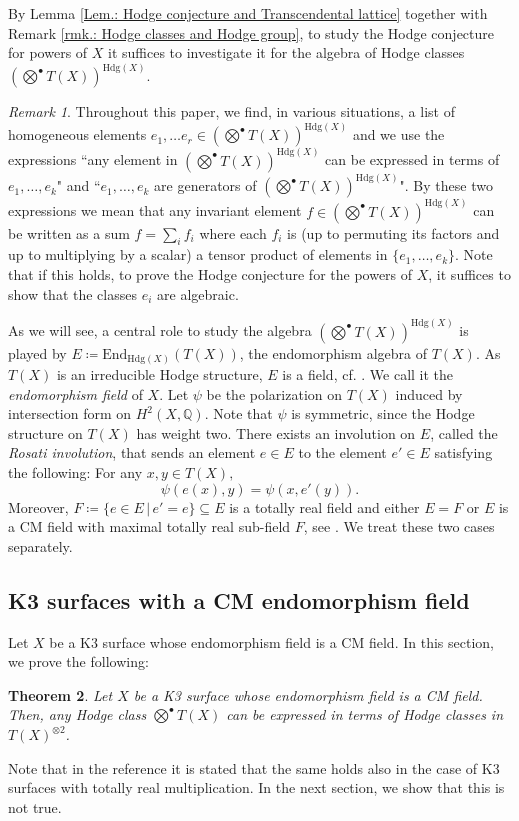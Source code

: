 \documentclass[11pt,twoside,a4paper]{amsart}
\newcommand{\0}{\mathscr{O}}
\theoremstyle{plain}
\newtheorem{thm}{Theorem}[section]
\theoremstyle{definition}
\theoremstyle{remark}
\newtheorem{rmk}[thm]{Remark}
\begin{document}
\smallskip

By Lemma \ref{Lem.: Hodge conjecture and Transcendental lattice} together with Remark \ref{rmk.: Hodge classes and Hodge group}, to study the Hodge conjecture for powers of $X$ it suffices to investigate it for the algebra of Hodge classes $\left(\bigotimes^{\bullet} T(X)\right)^{\mathrm{Hdg}(X)}$. 
\begin{rmk}
\label{rmk.: meaning of expressed in terms of}
Throughout this paper, we find, in various situations, a list of homogeneous elements $e_1,\ldots e_r\in\left(\bigotimes^{\bullet} T(X)\right)^{\mathrm{Hdg}(X)}$ and we use the expressions \textquotedblleft any element in $\left(\bigotimes^{\bullet} T(X)\right)^{\mathrm{Hdg}(X)}$ can be expressed in terms of $e_1,\ldots,e_k$" and \textquotedblleft $e_1,\ldots,e_k$ are generators of $\left(\bigotimes^{\bullet} T(X)\right)^{\mathrm{Hdg}(X)}$". By these two expressions we mean that any invariant element $f\in \left(\bigotimes^{\bullet} T(X)\right)^{\mathrm{Hdg}(X)}$ can be written as a sum $f=\sum_i f_i$ where each $f_i$ is (up to permuting its factors and up to multiplying by a scalar) a tensor product of elements in $\{e_1,\ldots,e_k\}$. Note that if this holds, to prove the Hodge conjecture for the powers of $X$, it suffices to show that the classes $e_i$ are algebraic.
\end{rmk}
As we will see, a central role to study the algebra $(\bigotimes^{\bullet} T(X))^{\mathrm{Hdg}(X)}$ is played by $E\coloneqq \mathrm{End}_{\mathrm{Hdg}(X)}(T(X))$, the endomorphism algebra of $T(X)$. As $T(X)$ is an irreducible Hodge structure, $E$ is a field, cf. \cite[Sec.\ 3.2]{huybrechtsK3surfaces}. We call it the \textit{endomorphism field} of $X$. Let $\psi$ be the polarization on $T(X)$ induced by intersection form on $H^2(X,\mathbb{Q})$. Note that $\psi$ is symmetric, since the Hodge structure on $T(X)$ has weight two. There exists an involution on $E$, called the \textit{Rosati involution}, that sends an element $e\in E$ to the element $e'\in E$ satisfying the following: For any $x,y\in T(X),$
\[\psi(e(x),y)=\psi(x,e'(y)).\]
Moreover, $F\coloneqq \{e\in E\,|\, e'=e\}\subseteq E$ is a totally real field and either $E=F$ or $E$ is a CM field with maximal totally real sub-field $F$, see \cite[Thm.\ 3.3.7]{huybrechtsK3surfaces}.
We treat these two cases separately.

\subsection{K3 surfaces with a CM endomorphism field}
\label{Section: CM case}
Let $X$ be a K3 surface whose endomorphism field is a CM field. In this section, we prove the following:
\begin{thm}\cite[Prop.\ 5.2]{mari2008hodge}
\label{Thm: invariant degree 2 elements generate in the CM case}
Let $X$ be a K3 surface whose endomorphism field is a CM field. Then, any Hodge class $\bigotimes^{\bullet}T(X)$ can be expressed in terms of Hodge classes in $T(X)^{\otimes 2}$.
\end{thm}
Note that in the reference it is stated that the same holds also in the case of K3 surfaces with totally real multiplication. In the next section, we show that this is not true.
\end{document}

